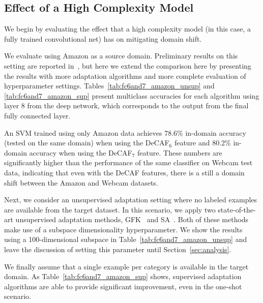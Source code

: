 \subsection{Effect of a High Complexity Model}




We begin by evaluating the effect that a high complexity model (in this case,
a fully trained convolutional net) has on mitigating domain shift.

We evaluate using Amazon as a source domain. 
Preliminary results on this setting are reported in~\cite{deeplearning-arxiv-2013}, but here 
we extend the comparison here by
presenting the results with more adaptation algorithms and more complete
evaluation of hyperparameter settings. Tables~\ref{tab:fc6and7_amazon_unsup} and \ref{tab:fc6and7_amazon_sup} present %
multiclass accuracies for each algorithm using layer 8 from the deep
network, which corresponds to the output from the final fully connected layer.

 An SVM trained using only Amazon data achieves 78.6\% in-domain accuracy (tested on the same domain) when using the DeCAF$_6$ feature and 80.2\% in-domain accuracy when using the DeCAF$_7$ feature. These numbers are significantly higher than the performance of the same classifier on Webcam test data, indicating that even with the DeCAF features, there is a still a domain shift between the Amazon and Webcam datasets. 

Next, we consider an unsupervised adaptation setting where no labeled examples are available from the target dataset. In this scenario, we apply two state-of-the-art unsupervised adaptation methods, GFK~\cite{gong-cvpr12} and SA~\cite{sa}. 
Both of these methods make use of a subspace dimensionality hyperparameter.
We show the results using a 100-dimensional subspace in Table~\ref{tab:fc6and7_amazon_unsup} and leave the discussion of setting this parameter until Section~\ref{sec:analysis}.

We finally assume that a single example per category is available in the target domain.
As Table~\ref{tab:fc6and7_amazon_sup} shows, supervised adaptation algorithms are able to provide significant improvement, even in the one-shot scenario. %




